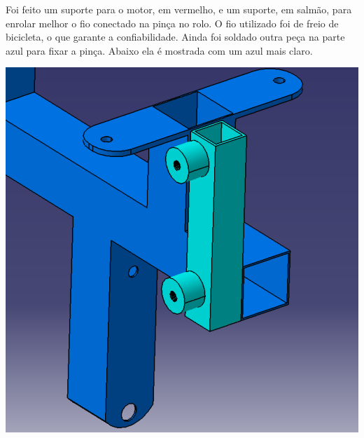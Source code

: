 
	Foi feito um suporte para o motor, em vermelho, e um suporte, em salmão, para enrolar melhor o fio conectado na pinça no rolo.  O fio utilizado foi de freio de bicicleta, o que garante a confiabilidade. Ainda foi soldado outra peça na parte azul para fixar a pinça. Abaixo ela é mostrada com um azul mais claro.
	
	      \begin{center}
    	\includegraphics[scale=0.5]{figuras/est_fixar_pinca}
        \label{est.fixar.pinca}
    \end{center} 